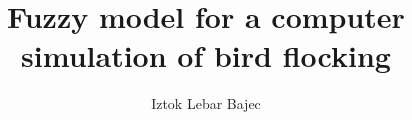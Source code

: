\documentclass[english,PhD]{FRIthesis}
\title[Fuzzy animats]%
      [Mehki animati]%
      {Fuzzy model for a computer simulation of bird flocking}%
      {Mehki model za računalniško simulacijo letenja ptic v jati}
\author[I. Lebar Bajec]{Iztok Lebar Bajec}{24940006}
\begin{document}
\maketitle

\makecopyright
\thesistopic
%

%
\makepreviouspublication



\frontmatter
 
 
 \tableofcontents 

\mainmatter
 
 
 
 
 
 
 
 

\backmatter
 
\end{document}
